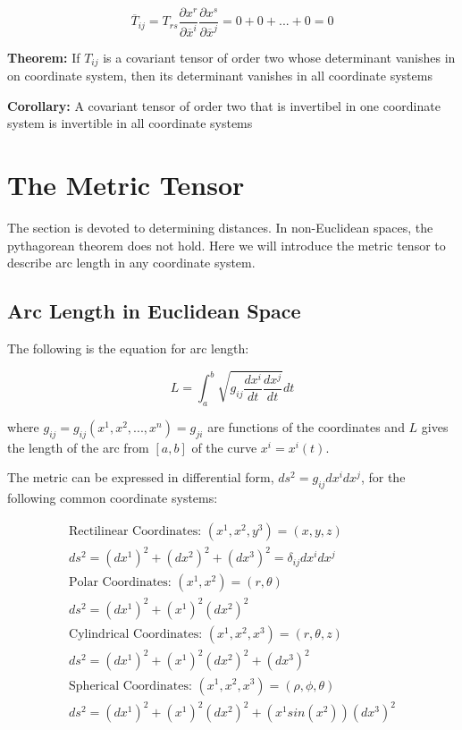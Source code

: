 \documentclass{article}
\begin{document}
\begin{equation*}
	\overline{ T }_{ij} = T_{rs} \frac{ \partial x^r }{ \partial \overline{ x }^i } \frac{ \partial x^s }{ \partial \overline{ x }^j } = 0 + 0 + ... + 0 = 0
\end{equation*}

\noindent \textbf{Theorem: }
If $T_{ij}$ is a covariant tensor of order two whose determinant vanishes in on coordinate system, then its determinant vanishes in all coordinate systems

\noindent \textbf{Corollary: }
A covariant tensor of order two that is invertibel in one coordinate system is invertible in all coordinate systems





%
%
\newpage
\section{The Metric Tensor}

The section is devoted to determining distances.  In non-Euclidean spaces, the pythagorean theorem does not hold.  Here we will introduce the metric tensor to describe arc length in any coordinate system.

\subsection{Arc Length in Euclidean Space}

The following is the equation for arc length:

\begin{equation}
	L = \int_a^b \sqrt{ g_{ij} \frac{ dx^i }{ dt } \frac{ dx^j }{ dt } } dt
\end{equation}

\noindent
where $g_{ij} = g_{ij}( x^1, x^2, ..., x^n ) = g_{ji}$ are functions of the coordinates and $L$ gives the length of the arc from $[a,b]$ of the curve $x^i = x^i(t)$.

The metric can be expressed in differential form, $ds^2 = g_{ij} dx^i dx^j$, for the following common coordinate systems:

\begin{gather*}
	\text{Rectilinear Coordinates: } (x^1, x^2, y^3) = (x, y, z)\\ ds^2 = (dx^1)^2 + (dx^2)^2 + (dx^3)^2 = \delta_{ij} dx^i dx^j\\
	\text{Polar Coordinates: } (x^1, x^2) = (r, \theta)\\ ds^2 = (dx^1)^2 + (x^1)^2 (dx^2)^2\\
	\text{Cylindrical Coordinates: } (x^1, x^2, x^3) = (r, \theta, z)\\ ds^2 = (dx^1)^2 + (x^1)^2 (dx^2)^2 + (dx^3)^2\\
	\text{Spherical Coordinates: } (x^1, x^2, x^3) = (\rho, \phi, \theta)\\ ds^2 = (dx^1)^2 + (x^1)^2 (dx^2)^2 + (x^1 sin( x^2 ))(dx^3)^2\\
\end{gather*}
\end{document}
